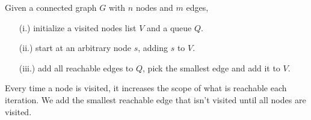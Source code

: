 \vspace{-1em}
\begin{theo}

    Given a connected graph $G$ with $n$ nodes and $m$ edges,
    \begin{enumerate}
        \item [(i.)] initialize a visited nodes list $V$ and a queue $Q$.
        \item [(ii.)] start at an arbitrary node $s$, adding $s$ to $V$.
        \item [(iii.)] add all reachable edges to $Q$, pick the smallest edge and add it to $V$.
    \end{enumerate}
    \noindent
    Every time a node is visited, it increases the scope of what is reachable each iteration. We add the smallest reachable edge that isn't visited until all nodes are visited.
\end{theo}

